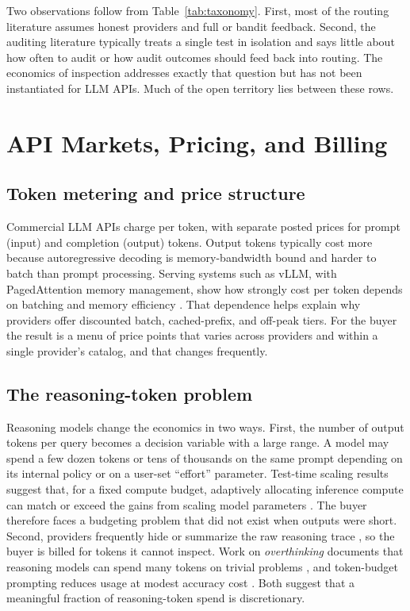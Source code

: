 Two observations follow from Table~\ref{tab:taxonomy}. First, most of the routing literature assumes honest providers and full or bandit feedback. Second, the auditing literature typically treats a single test in isolation and says little about how often to audit or how audit outcomes should feed back into routing. The economics of inspection addresses exactly that question but has not been instantiated for LLM APIs. Much of the open territory lies between these rows.

\section{API Markets, Pricing, and Billing}\label{api-markets-pricing-and-billing}

\subsection{Token metering and price structure}\label{token-metering-and-price-structure}

Commercial LLM APIs charge per token, with separate posted prices for prompt (input) and completion (output) tokens. Output tokens typically cost more because autoregressive decoding is memory-bandwidth bound and harder to batch than prompt processing. Serving systems such as vLLM, with PagedAttention memory management, show how strongly cost per token depends on batching and memory efficiency \cite{kwon2023vllm}. That dependence helps explain why providers offer discounted batch, cached-prefix, and off-peak tiers. For the buyer the result is a menu of price points that varies across providers and within a single provider's catalog, and that changes frequently.

\subsection{The reasoning-token problem}\label{the-reasoning-token-problem}

Reasoning models change the economics in two ways. First, the number of output tokens per query becomes a decision variable with a large range. A model may spend a few dozen tokens or tens of thousands on the same prompt depending on its internal policy or on a user-set ``effort'' parameter. Test-time scaling results suggest that, for a fixed compute budget, adaptively allocating inference compute can match or exceed the gains from scaling model parameters \cite{snell2024scaling}. The buyer therefore faces a budgeting problem that did not exist when outputs were short. Second, providers frequently hide or summarize the raw reasoning trace \cite{openai2024o1card}, so the buyer is billed for tokens it cannot inspect. Work on \emph{overthinking} documents that reasoning models can spend many tokens on trivial problems \cite{chen2024overthinking}, and token-budget prompting reduces usage at modest accuracy cost \cite{han2024tokenbudget}. Both suggest that a meaningful fraction of reasoning-token spend is discretionary.


